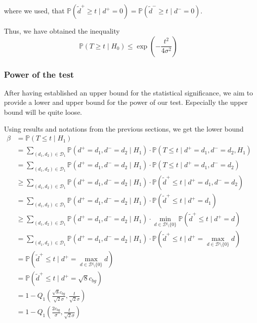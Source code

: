\documentclass[a4paper,12pt]{article}
\theoremstyle{plain}
\theoremstyle{definition}
\theoremstyle{remark}
\begin{document}
where we used, that $\mathbb{P}(\tilde{d}^+ \geq t \mid d^+ = 0) = \mathbb{P}(\tilde{d}^- \geq t \mid d^- = 0)$.

Thus, we have obtained the inequality
\begin{equation}
	\mathbb{P}(T \geq t \mid H_0) \leq \exp \left( - \frac{t^2}{4 \sigma^2} \right)
\end{equation}

\subsubsection{Power of the test}
After having established an upper bound for the statistical significance, we aim to provide a lower and upper bound for the power of our test. Especially the upper bound will be quite loose.

Using results and notations from the previous sections, we get the lower bound
\begin{align*}
	\beta &= \mathbb{P}(T \leq t \mid H_1) \\
	&= \sum_{(d_1, d_2) \in \mathcal{D}_1} \mathbb{P}(d^+ = d_1, d^- = d_2 \mid H_1) \cdot \mathbb{P}(T \leq t \mid d^+ = d_1, d^- = d_2, H_1) \\
	&= \sum_{(d_1, d_2) \in \mathcal{D}_1} \mathbb{P}(d^+ = d_1, d^- = d_2 \mid H_1) \cdot \mathbb{P}(T \leq t \mid d^+ = d_1, d^- = d_2) \\
	&\geq \sum_{(d_1, d_2) \in \mathcal{D}_1} \mathbb{P}(d^+ = d_1, d^- = d_2 \mid H_1) \cdot \mathbb{P}(\tilde{d}^+ \leq t \mid d^+ = d_1, d^- = d_2) \\
	&= \sum_{(d_1, d_2) \in \mathcal{D}_1} \mathbb{P}(d^+ = d_1, d^- = d_2 \mid H_1) \cdot \mathbb{P}(\tilde{d}^+ \leq t \mid d^+ = d_1) \\
	&\geq \sum_{(d_1, d_2) \in \mathcal{D}_1} \mathbb{P}(d^+ = d_1, d^- = d_2 \mid H_1) \cdot \min_{d \in \mathcal{D} \setminus \{ 0 \}} \mathbb{P}(\tilde{d}^+ \leq t \mid d^+ = d) \\
	&= \sum_{(d_1, d_2) \in \mathcal{D}_1} \mathbb{P}(d^+ = d_1, d^- = d_2 \mid H_1) \cdot \mathbb{P}(\tilde{d}^+ \leq t \mid d^+ = \max_{d \in \mathcal{D} \setminus \{ 0 \}} d) \\
	&= \mathbb{P}(\tilde{d}^+ \leq t \mid d^+ = \max_{d \in \mathcal{D} \setminus \{ 0 \}} d) \\
	&= \mathbb{P}(\tilde{d}^+ \leq t \mid d^+ = \sqrt{8} c_{bg}) \\
	&= 1 - Q_1 \left( \frac{\sqrt{8} c_{bg}}{\sqrt{2} \sigma}, \frac{t}{\sqrt{2} \sigma} \right) \\
	&= 1 - Q_1 \left( \frac{2 c_{bg}}{\sigma}, \frac{t}{\sqrt{2} \sigma} \right)
\end{align*}
\end{document}
